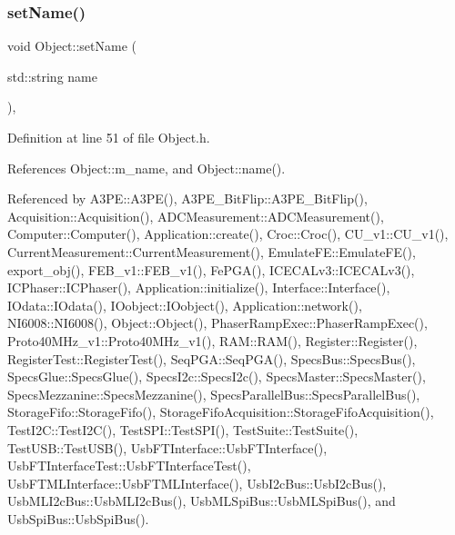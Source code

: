\subsubsection{\texorpdfstring{set\+Name()}{setName()}}
{\footnotesize\ttfamily void Object\+::set\+Name (\begin{DoxyParamCaption}\item[{std\+::string}]{name }\end{DoxyParamCaption})\hspace{0.3cm}{\ttfamily [inline]}, {\ttfamily [inherited]}}



Definition at line 51 of file Object.\+h.



References Object\+::m\+\_\+name, and Object\+::name().



Referenced by A3\+P\+E\+::\+A3\+P\+E(), A3\+P\+E\+\_\+\+Bit\+Flip\+::\+A3\+P\+E\+\_\+\+Bit\+Flip(), Acquisition\+::\+Acquisition(), A\+D\+C\+Measurement\+::\+A\+D\+C\+Measurement(), Computer\+::\+Computer(), Application\+::create(), Croc\+::\+Croc(), C\+U\+\_\+v1\+::\+C\+U\+\_\+v1(), Current\+Measurement\+::\+Current\+Measurement(), Emulate\+F\+E\+::\+Emulate\+F\+E(), export\+\_\+obj(), F\+E\+B\+\_\+v1\+::\+F\+E\+B\+\_\+v1(), Fe\+P\+G\+A(), I\+C\+E\+C\+A\+Lv3\+::\+I\+C\+E\+C\+A\+Lv3(), I\+C\+Phaser\+::\+I\+C\+Phaser(), Application\+::initialize(), Interface\+::\+Interface(), I\+Odata\+::\+I\+Odata(), I\+Oobject\+::\+I\+Oobject(), Application\+::network(), N\+I6008\+::\+N\+I6008(), Object\+::\+Object(), Phaser\+Ramp\+Exec\+::\+Phaser\+Ramp\+Exec(), Proto40\+M\+Hz\+\_\+v1\+::\+Proto40\+M\+Hz\+\_\+v1(), R\+A\+M\+::\+R\+A\+M(), Register\+::\+Register(), Register\+Test\+::\+Register\+Test(), Seq\+P\+G\+A\+::\+Seq\+P\+G\+A(), Specs\+Bus\+::\+Specs\+Bus(), Specs\+Glue\+::\+Specs\+Glue(), Specs\+I2c\+::\+Specs\+I2c(), Specs\+Master\+::\+Specs\+Master(), Specs\+Mezzanine\+::\+Specs\+Mezzanine(), Specs\+Parallel\+Bus\+::\+Specs\+Parallel\+Bus(), Storage\+Fifo\+::\+Storage\+Fifo(), Storage\+Fifo\+Acquisition\+::\+Storage\+Fifo\+Acquisition(), Test\+I2\+C\+::\+Test\+I2\+C(), Test\+S\+P\+I\+::\+Test\+S\+P\+I(), Test\+Suite\+::\+Test\+Suite(), Test\+U\+S\+B\+::\+Test\+U\+S\+B(), Usb\+F\+T\+Interface\+::\+Usb\+F\+T\+Interface(), Usb\+F\+T\+Interface\+Test\+::\+Usb\+F\+T\+Interface\+Test(), Usb\+F\+T\+M\+L\+Interface\+::\+Usb\+F\+T\+M\+L\+Interface(), Usb\+I2c\+Bus\+::\+Usb\+I2c\+Bus(), Usb\+M\+L\+I2c\+Bus\+::\+Usb\+M\+L\+I2c\+Bus(), Usb\+M\+L\+Spi\+Bus\+::\+Usb\+M\+L\+Spi\+Bus(), and Usb\+Spi\+Bus\+::\+Usb\+Spi\+Bus().


